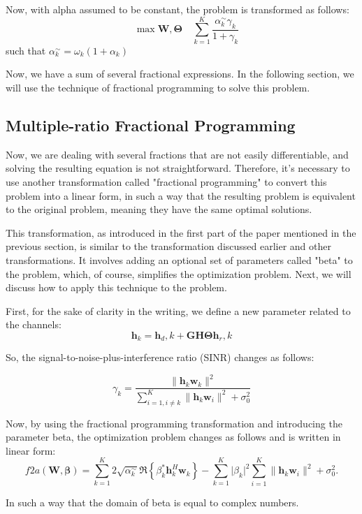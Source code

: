 \documentclass{article}
\begin{document}
Now, with alpha assumed to be constant, the problem is 
transformed as follows:
\[
\quad \max \mathbf{W}, \boldsymbol{\Theta} \quad \sum_{k=1}^{K} \frac{\alpha_k^\sim \gamma_k}{1 + \gamma_k}
\]
such that $\alpha_k^\sim = \omega_k(1 + \alpha_k)$

Now, we have a sum of several fractional expressions. In the following section, we will use the technique of fractional programming to solve this problem.

\subsection{Multiple-ratio Fractional Programming}
Now, we are dealing with several fractions that are not easily differentiable, and solving the resulting equation is not straightforward. Therefore, it's necessary to use another transformation called "fractional programming" to convert this problem into a linear form, in such a way that the resulting problem is equivalent to the original problem, meaning they have the same optimal solutions.

This transformation, as introduced in the first part of the paper mentioned in the previous section, is similar to the transformation discussed earlier and other transformations. It involves adding an optional set of parameters called "beta" to the problem, which, of course, simplifies the optimization problem.
Next, we will discuss how to apply this technique to the problem.

First, for the sake of clarity in the writing, we define a new parameter related to the channels:
\[\mathbf{h}_k = \mathbf{h}_d,k + \mathbf{GH}\boldsymbol{\Theta}\mathbf{h}_r,k\]

So, the signal-to-noise-plus-interference ratio (SINR) changes as follows:

\[
\gamma_k = \frac{{\lVert \mathbf{h}_k \mathbf{w}_k \rVert^2}}{{\sum_{i=1,i\neq k}^{K} \lVert \mathbf{h}_k \mathbf{w}_i \rVert^2 + \sigma_0^2}}
\]

Now, by using the fractional programming transformation and introducing the parameter beta, the optimization problem changes as follows and is written in linear form:
\[
f2a(\mathbf{W}, \boldsymbol{\beta}) = \sum_{k=1}^{K} 2 \sqrt{\alpha_k^\sim} \Re \left\{ \beta_k^* \mathbf{h}_k^H \mathbf{w}_k \right\} - \sum_{k=1}^{K} \lvert \beta_k \rvert^2 \sum_{i=1}^{K} \lVert \mathbf{h}_k \mathbf{w}_i \rVert^2 + \sigma_0^2.
\]

In such a way that the domain of beta is equal to complex numbers.
\end{document}
